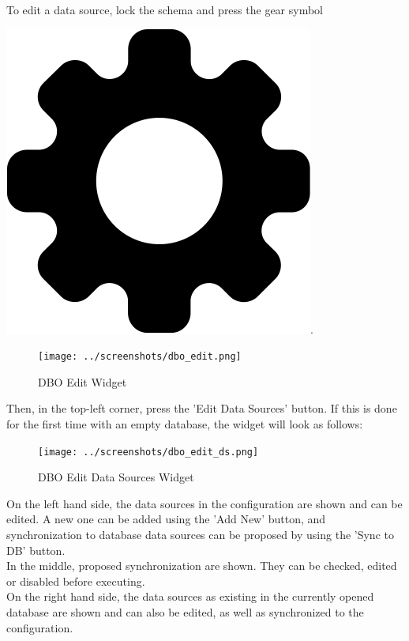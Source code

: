 To edit a data source, lock the schema and press the gear symbol {\includegraphics[scale=0.02]{../../data/icons/edit.png}.

\begin{figure}[H]
  \hspace*{-1.5cm}
    \texttt{[image: ../screenshots/dbo\_edit.png]}
  \caption{DBO Edit Widget}
  \label{fig:dbo_edit}
\end{figure}

Then, in the top-left corner, press the 'Edit Data Sources' button. If this is done for the first time with an empty database, the widget will look as follows:

\begin{figure}[H]
  \hspace*{-1cm}
    \texttt{[image: ../screenshots/dbo\_edit\_ds.png]}
  \caption{DBO Edit Data Sources Widget}
  \label{fig:dbo_edit_ds}
\end{figure}

On the left hand side, the data sources in the configuration are shown and can be edited. A new one can be added using the 'Add New' button, and synchronization to database data sources can be proposed by using the 'Sync to DB' button. \\

In the middle, proposed synchronization are shown. They can be checked, edited or disabled before executing. \\

On the right hand side, the data sources as existing in the currently opened database are shown and can also be edited, as well as synchronized to the configuration. \\

}
